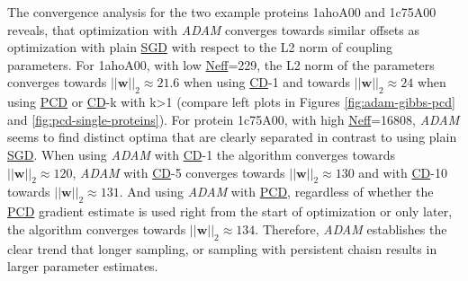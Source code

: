 \documentclass[11pt,a4paper,twoside]{book}
\newcommand{\w}{\mathbf{w}}
\theoremstyle{definition}
\theoremstyle{definition}
\theoremstyle{remark}
\begin{document}
The convergence analysis for the two example proteins 1ahoA00 and
1c75A00 reveals, that optimization with \emph{ADAM} converges towards
similar offsets as optimization with plain
\protect\hyperlink{abbrev}{SGD} with respect to the L2 norm of coupling
parameters. For 1ahoA00, with low \protect\hyperlink{abbrev}{Neff}=229,
the L2 norm of the parameters converges towards
\(||\w||_2 \approx 21.6\) when using \protect\hyperlink{abbrev}{CD}-1
and towards \(||\w||_2 \approx 24\) when using
\protect\hyperlink{abbrev}{PCD} or \protect\hyperlink{abbrev}{CD}-k with
k\textgreater{}1 (compare left plots in Figures \ref{fig:adam-gibbs-pcd}
and \ref{fig:pcd-single-proteins}). For protein 1c75A00, with high
\protect\hyperlink{abbrev}{Neff}=16808, \emph{ADAM} seems to find
distinct optima that are clearly separated in contrast to using plain
\protect\hyperlink{abrev}{SGD}. When using \emph{ADAM} with
\protect\hyperlink{abbrev}{CD}-1 the algorithm converges towards
\(||\w||_2 \approx 120\), \emph{ADAM} with
\protect\hyperlink{abbrev}{CD}-5 converges towards
\(||\w||_2 \approx 130\) and with \protect\hyperlink{abbrev}{CD}-10
towards \(||\w||_2 \approx 131\). And using \emph{ADAM} with
\protect\hyperlink{abrrev}{PCD}, regardless of whether the
\protect\hyperlink{abrrev}{PCD} gradient estimate is used right from the
start of optimization or only later, the algorithm converges towards
\(||\w||_2 \approx 134\). Therefore, \emph{ADAM} establishes the clear
trend that longer sampling, or sampling with persistent chaisn results
in larger parameter estimates.
\end{document}
